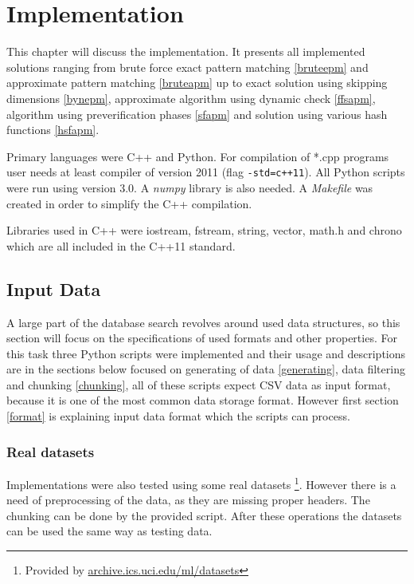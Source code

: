 \chapter{Implementation} \label{implementation}
This chapter will discuss the implementation. It presents all implemented solutions ranging from brute force exact pattern matching \ref{bruteepm} and approximate pattern matching \ref{bruteapm} up to exact solution using skipping dimensions \ref{bynepm}, approximate algorithm using dynamic check \ref{ffsapm}, algorithm using preverification phases \ref{sfapm} and solution using various hash functions \ref{hsfapm}.

Primary languages were C++ and Python. For compilation of *.cpp programs user needs at least compiler of version 2011 (flag \texttt{-std=c++11}). All Python scripts were run using version 3.0. A \textit{numpy} library is also needed. A \textit{Makefile} was created in order to simplify the C++ compilation.

Libraries used in C++ were iostream, fstream, string, vector, math.h and chrono which are all included in the C++11 standard.

\section{Input Data}
A large part of the database search revolves around used data structures, so this section will focus on the specifications of used formats and other properties. For this task three Python scripts were implemented and their usage and descriptions are in the sections below focused on generating of data \ref{generating}, data filtering and chunking \ref{chunking}, all of these scripts expect CSV data as input format, because it is one of the most common data storage format. However first section \ref{format} is explaining input data format which the scripts can process.

\subsection{Real datasets}
Implementations were also tested using some real datasets \footnote{Provided by \url{archive.ics.uci.edu/ml/datasets}}. However there is a need of preprocessing of the data, as they are missing proper headers. The chunking can be done by the provided script. After these operations the datasets can be used the same way as testing data.

